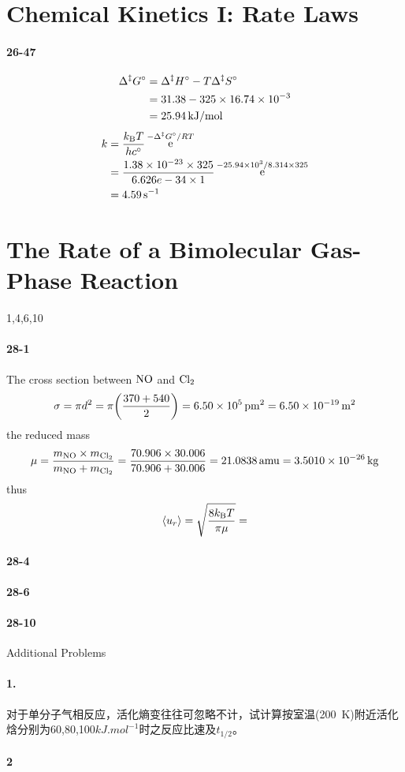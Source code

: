 \documentclass[a4paper]{article}
\DeclareMathOperator{\e}{\mathrm{e}}
\newcommand{\kB}{k_\mathrm{B}}
\newcommand{\ex}[1]{\paragraph{#1}}
\numberwithin{equation}{section}
\begin{document}
\section{Chemical Kinetics I: Rate Laws}
\ex{26-47}
\begin{align}
\Delta^\ddagger G^\circ &= \Delta^\ddagger H^\circ - T\Delta^\ddagger S^\circ \notag\\
&= 31.38 - 325\times \num{16.74e-3} \notag\\
&= \SI{25.94}{kJ/mol}
\end{align}
\begin{align}
k &= \dfrac{\kB T}{h c^\circ}\e^{-\Delta^\ddagger G^\circ/RT} \notag\\
&= \dfrac{\num{1.38e-23}\times 325}{6.626e-34\times 1} \e^{\num{-25.94e3}/8.314\times 325} \notag\\
&= \SI{4.59}{s^{-1}}
\end{align}


\setcounter{section}{27}
\section{The Rate of a Bimolecular Gas-Phase Reaction}
1,4,6,10\\
\ex{28-1}
The cross section between $ \ce{NO} $ and $ \ce{Cl_2} $
\begin{equation}\label{key}
\sigma = \pi d^2 = \pi \qty(\dfrac{370 + 540}{2}) = \SI{6.50e5}{pm^2} = \SI{6.50e-19}{m^2}
\end{equation}
the reduced mass
\begin{equation}\label{key}
\mu = \dfrac{m_{\ce{NO}}\times m_{\ce{Cl_2}}}{m_{\ce{NO}} + m_{\ce{Cl_2}}} = \dfrac{70.906\times 30.006}{70.906 + 30.006} = \SI{21.0838}{amu} = \SI{3.5010e-26}{kg}
\end{equation}
thus 
\begin{equation}\label{key}
\ev{u_r} = \sqrt{\dfrac{8\kB T}{\pi \mu}} = 
\end{equation}

\ex{28-4}


\ex{28-6}



\ex{28-10}



Additional Problems\\
\ex{1.} 对于单分子气相反应，活化熵变往往可忽略不计，试计算按室温(\SI{200}{K})附近活化焓分别为60,80,100$ \si{kJ.mol^{-1}} $时之反应比速及$ t_{1/2} $。


\ex{2}
\end{document}
